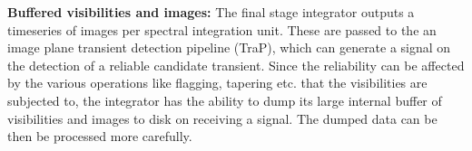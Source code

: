 \documentclass{ws-jai}
\begin{document}
\noindent \textbf {Buffered visibilities and images:} The final stage integrator outputs a
timeseries of images  per spectral integration unit. These are  passed to the an
image plane transient detection pipeline (TraP),  which can generate a signal on
the detection  of a reliable candidate  transient. Since the reliability  can be
affected  by the  various  operations  like flagging,  tapering  etc.  that  the
visibilities are subjected to, the integrator  has the ability to dump its large
internal buffer  of visibilities and images  to disk on receiving  a signal. The
dumped data can be then be processed more carefully.\\


\end{document}
